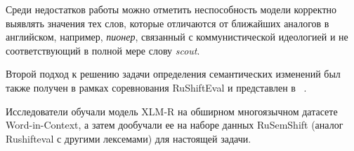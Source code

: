 \documentclass[LI,VKR]{HSEUniversity}
\begin{document}

%

Среди недостатков работы можно отметить неспособность модели корректно выявлять
значения тех слов, которые отличаются от ближайших аналогов в английском, например,
\textit{пионер}, связанный с коммунистической идеологией и не соответствующий в полной мере
слову \textit{scout}.

Второй подход к решению задачи определения семантических изменений был также получен
в рамках соревнования RuShiftEval и представлен в ~\cite{DeepMistake}.

Исследователи обучали модель XLM-R на обширном многоязычном датасете Word-in-Context,
а затем дообучали ее на наборе данных RuSemShift (аналог Rushifteval с другими лексемами)
для настоящей задачи.
\end{document}
